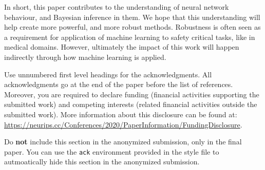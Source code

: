 \documentclass{article}
\theoremstyle{definition}
\newcommand{\vX}{\mathbf{X}}
\newcommand{\patchfun}[1]{{#1}\text{th patch}}
\newcommand{\bracket}[3]{{\left#1 #3 \right#2}}
\newcommand{\bra}{\bracket{(}{)}}
\newcommand{\ssup}[1]{^{\bra{#1}}}
\begin{document}
In short, this paper contributes to the understanding of neural network behaviour, and Bayesian inference in them. We hope that this understanding will help create more powerful, and more robust methods. Robustness is often seen as a requirement for application of machine learning to safety critical tasks, like in medical domains. However, ultimately the impact of this work will happen indirectly through how machine learning is applied.



\begin{ack}
Use unnumbered first level headings for the acknowledgments. All acknowledgments
go at the end of the paper before the list of references. Moreover, you are required to declare 
funding (financial activities supporting the submitted work) and competing interests (related financial activities outside the submitted work). 
More information about this disclosure can be found at: \url{https://neurips.cc/Conferences/2020/PaperInformation/FundingDisclosure}.


Do {\bf not} include this section in the anonymized submission, only in the final paper. You can use the \texttt{ack} environment provided in the style file to autmoatically hide this section in the anonymized submission.
\end{ack}

\printbibliography

\newpage



\end{document}
